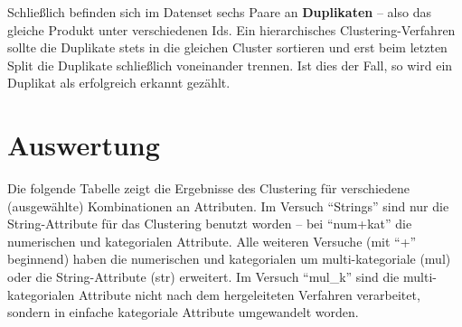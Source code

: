 Schließlich befinden sich im Datenset sechs Paare an \textbf{Duplikaten}
-- also das gleiche Produkt unter verschiedenen Ids. Ein hierarchisches
Clustering-Verfahren sollte die Duplikate stets in die gleichen Cluster
sortieren und erst beim letzten Split die Duplikate schließlich
voneinander trennen. Ist dies der Fall, so wird ein Duplikat als
erfolgreich erkannt gezählt.

\hypertarget{auswertung}{%
\section{Auswertung}\label{auswertung}}

Die folgende Tabelle zeigt die Ergebnisse des Clustering für
verschiedene (ausgewählte) Kombinationen an Attributen. Im Versuch
``Strings'' sind nur die String-Attribute für das Clustering benutzt
worden -- bei ``num+kat'' die numerischen und kategorialen Attribute.
Alle weiteren Versuche (mit ``+'' beginnend) haben die numerischen und
kategorialen um multi-kategoriale (mul) oder die String-Attribute (str)
erweitert. Im Versuch ``mul\_k'' sind die multi-kategorialen Attribute
nicht nach dem hergeleiteten Verfahren verarbeitet, sondern in einfache
kategoriale Attribute umgewandelt worden.

